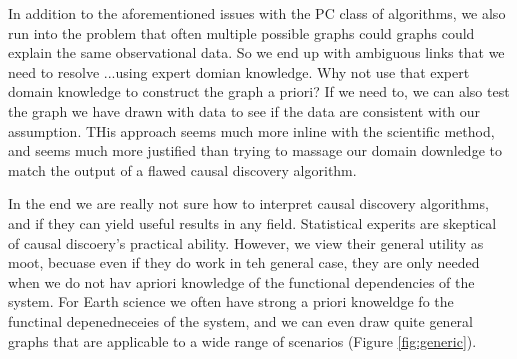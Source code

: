 \documentclass[12pt]{article}
\begin{document}
In addition to the aforementioned issues with the PC class of
algorithms, we also run into the problem that often multiple possible
graphs could graphs could explain the same observational data. So we
end up with ambiguous links that we need to resolve ...using expert
domian knowledge. Why not use that expert domain knowledge to
construct the graph a priori? If we need to, we can also test the
graph we have drawn with data to see if the data are consistent with
our assumption. THis approach seems much more inline with the
scientific method, and seems much more justified than trying to
massage our domain downledge to match the output of a flawed causal
discovery algorithm.

In the end we are really not sure how to interpret causal discovery
algorithms, and if they can yield useful results in any
field. Statistical experits \citep{freedman2010statistical} are
skeptical of causal discoery's practical ability. However, we view
their general utility as moot, becuase even if they do work in teh
general case, they are only needed when we do not hav apriori
knowledge of the functional dependencies of the system. For Earth
science we often have strong a priori knoweldge fo the functinal
depenedneceies of the system, and we can even draw quite general
graphs that are applicable to a wide range of scenarios (Figure
\ref{fig:generic}).
\end{document}
